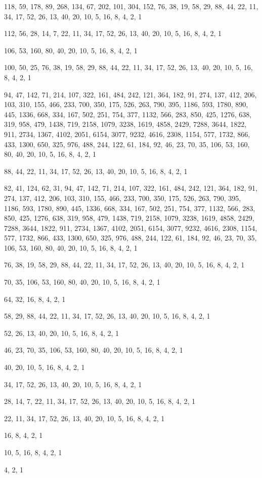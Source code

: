 \documentclass[12pt]{article}
\begin{document}
118, 59, 178, 89, 268, 134, 67, 202, 101, 304, 152, 76, 38, 19, 58, 29, 88, 44, 22, 11, 34, 17, 52, 26, 13, 40, 20, 10, 5, 16, 8, 4, 2, 1

112, 56, 28, 14, 7, 22, 11, 34, 17, 52, 26, 13, 40, 20, 10, 5, 16, 8, 4, 2, 1

106, 53, 160, 80, 40, 20, 10, 5, 16, 8, 4, 2, 1

100, 50, 25, 76, 38, 19, 58, 29, 88, 44, 22, 11, 34, 17, 52, 26, 13, 40, 20, 10, 5, 16, 8, 4, 2, 1

94, 47, 142, 71, 214, 107, 322, 161, 484, 242, 121, 364, 182, 91, 274, 137, 412, 206, 103, 310, 155, 466, 233, 700, 350, 175, 526, 263, 790, 395, 1186, 593, 1780, 890, 445, 1336, 668, 334, 167, 502, 251, 754, 377, 1132, 566, 283, 850, 425, 1276, 638, 319, 958, 479, 1438, 719, 2158, 1079, 3238, 1619, 4858, 2429, 7288, 3644, 1822, 911, 2734, 1367, 4102, 2051, 6154, 3077, 9232, 4616, 2308, 1154, 577, 1732, 866, 433, 1300, 650, 325, 976, 488, 244, 122, 61, 184, 92, 46, 23, 70, 35, 106, 53, 160, 80, 40, 20, 10, 5, 16, 8, 4, 2, 1

88, 44, 22, 11, 34, 17, 52, 26, 13, 40, 20, 10, 5, 16, 8, 4, 2, 1

82, 41, 124, 62, 31, 94, 47, 142, 71, 214, 107, 322, 161, 484, 242, 121, 364, 182, 91, 274, 137, 412, 206, 103, 310, 155, 466, 233, 700, 350, 175, 526, 263, 790, 395, 1186, 593, 1780, 890, 445, 1336, 668, 334, 167, 502, 251, 754, 377, 1132, 566, 283, 850, 425, 1276, 638, 319, 958, 479, 1438, 719, 2158, 1079, 3238, 1619, 4858, 2429, 7288, 3644, 1822, 911, 2734, 1367, 4102, 2051, 6154, 3077, 9232, 4616, 2308, 1154, 577, 1732, 866, 433, 1300, 650, 325, 976, 488, 244, 122, 61, 184, 92, 46, 23, 70, 35, 106, 53, 160, 80, 40, 20, 10, 5, 16, 8, 4, 2, 1

76, 38, 19, 58, 29, 88, 44, 22, 11, 34, 17, 52, 26, 13, 40, 20, 10, 5, 16, 8, 4, 2, 1

70, 35, 106, 53, 160, 80, 40, 20, 10, 5, 16, 8, 4, 2, 1

64, 32, 16, 8, 4, 2, 1

58, 29, 88, 44, 22, 11, 34, 17, 52, 26, 13, 40, 20, 10, 5, 16, 8, 4, 2, 1

52, 26, 13, 40, 20, 10, 5, 16, 8, 4, 2, 1

46, 23, 70, 35, 106, 53, 160, 80, 40, 20, 10, 5, 16, 8, 4, 2, 1

40, 20, 10, 5, 16, 8, 4, 2, 1

34, 17, 52, 26, 13, 40, 20, 10, 5, 16, 8, 4, 2, 1

28, 14, 7, 22, 11, 34, 17, 52, 26, 13, 40, 20, 10, 5, 16, 8, 4, 2, 1

22, 11, 34, 17, 52, 26, 13, 40, 20, 10, 5, 16, 8, 4, 2, 1

16, 8, 4, 2, 1

10, 5, 16, 8, 4, 2, 1

4, 2, 1
\end{document}
